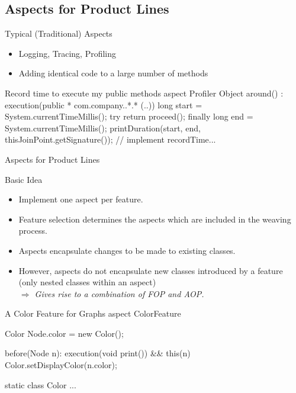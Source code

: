 \subsection{Aspects for Product Lines}

\begin{frame}[fragile]{Typical (Traditional) Aspects}
	\begin{itemize}
		\item Logging, Tracing, Profiling
		\item Adding identical code to a large number of methods
	\end{itemize}
\begin{codetight}{Record time to execute my public methods}
aspect Profiler {   
    Object around() : execution(public * com.company..*.* (..)) {
        long start = System.currentTimeMillis();
        try {
            return proceed();
        } finally {
            long end = System.currentTimeMillis();
            printDuration(start, end, 
                thisJoinPoint.getSignature());
        }
    }
    // implement recordTime...
}
\end{codetight}	
\end{frame}

\begin{frame}[fragile]{Aspects for Product Lines}
	\begin{mycolumns}[widths={45,55},animation=none]
		\begin{definition}{Basic Idea}
			\begin{itemize}
				\item Implement one aspect per feature.
				\item Feature selection determines the aspects which are included in the weaving process.
			\end{itemize}
		\end{definition}
		\begin{note}{}
			\begin{itemize}
				\item Aspects encapsulate changes to be made to existing classes. 
				\item However, aspects do not encapsulate new classes introduced by a feature (only nested classes within an aspect)\\
					\emph{$\Rightarrow$ Gives rise to a combination of FOP and AOP.}
			\end{itemize}
		\end{note}
	\mynextcolumn
\begin{codetight}{A Color Feature for Graphs}
aspect ColorFeature {
	Color Node.color = new Color();
	
	before(Node n): execution(void print()) && this(n) {
		Color.setDisplayColor(n.color);
	}
	
	static class Color {
		...
	}
}
\end{codetight}	
	\end{mycolumns}
\end{frame}

